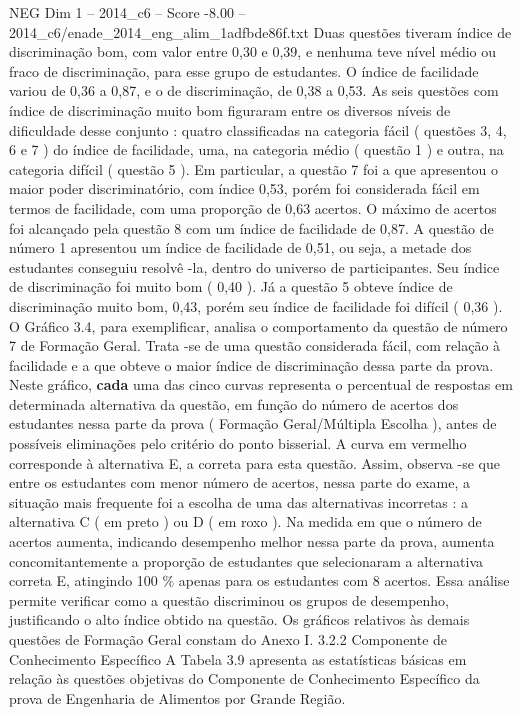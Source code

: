 \begin{textsample}{NEG Dim 1 – 2014\_c6 – Score -8.00 – 2014\_c6/enade\_2014\_eng\_alim\_1adfbde86f.txt}
Duas questões tiveram índice de discriminação bom, com valor entre 0,30 e 0,39, e nenhuma teve nível médio ou fraco de discriminação, para esse grupo de estudantes.
O índice de facilidade variou de 0,36 a 0,87, e o de discriminação, de 0,38 a 0,53.
As seis questões com índice de discriminação muito bom figuraram entre os diversos níveis de dificuldade desse conjunto : quatro classificadas na categoria fácil ( questões 3, 4, 6 e 7 ) do índice de facilidade, uma, na categoria médio ( questão 1 ) e outra, na categoria difícil ( questão 5 ).
Em particular, a questão 7 foi a que apresentou o maior poder discriminatório, com índice 0,53, porém foi considerada fácil em termos de facilidade, com uma proporção de 0,63 acertos.
O máximo de acertos foi alcançado pela questão 8 com um índice de facilidade de 0,87.
A questão de número 1 apresentou um índice de facilidade de 0,51, ou seja, a metade dos estudantes conseguiu resolvê -la, dentro do universo de participantes.
Seu índice de discriminação foi muito bom ( 0,40 ).
Já a questão 5 obteve índice de discriminação muito bom, 0,43, porém seu índice de facilidade foi difícil ( 0,36 ).
O Gráfico 3.4, para exemplificar, analisa o comportamento da questão de número 7 de Formação Geral.
Trata -se de uma questão considerada fácil, com relação à facilidade e a que obteve o maior índice de discriminação dessa parte da prova.
Neste gráfico, \textbf{cada} uma das cinco curvas representa o percentual de respostas em determinada alternativa da questão, em função do número de acertos dos estudantes nessa parte da prova ( Formação Geral/Múltipla Escolha ), antes de possíveis eliminações pelo critério do ponto bisserial.
A curva em vermelho corresponde à alternativa E, a correta para esta questão.
Assim, observa -se que entre os estudantes com menor número de acertos, nessa parte do exame, a situação mais frequente foi a escolha de uma das alternativas incorretas : a alternativa C ( em preto ) ou D ( em roxo ).
Na medida em que o número de acertos aumenta, indicando desempenho melhor nessa parte da prova, aumenta concomitantemente a proporção de estudantes que selecionaram a alternativa correta E, atingindo 100 \% apenas para os estudantes com 8 acertos.
Essa análise permite verificar como a questão discriminou os grupos de desempenho, justificando o alto índice obtido na questão.
Os gráficos relativos às demais questões de Formação Geral constam do Anexo I. 3.2.2 Componente de Conhecimento Específico A Tabela 3.9 apresenta as estatísticas básicas em relação às questões objetivas do Componente de Conhecimento Específico da prova de Engenharia de Alimentos por Grande Região.

\end{textsample}
